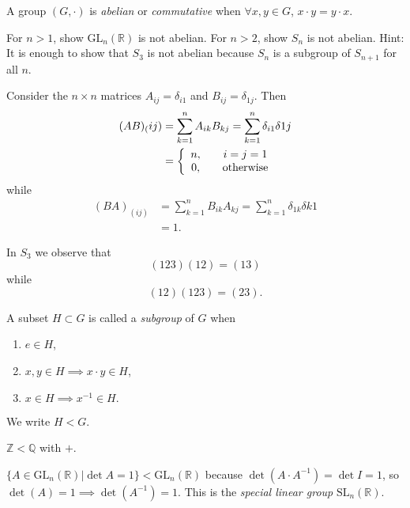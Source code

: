 \begin{defn}
  \label{def:abelian-group}
  A group $(G, \cdot)$ is \emph{abelian} or \emph{commutative} when
  $\forall x, y \in G$, $x \cdot y = y \cdot x$.
\end{defn}

\begin{Problem}
  For $n > 1$, show $\mathrm{GL}_n(\mathbb{R})$ is not abelian.
  For $n > 2$, show $S_n$ is not abelian.
  Hint: It is enough to show that $S_3$ is not abelian because
  $S_n$ is a subgroup of $S_{n+1}$ for all $n$.
\end{Problem}

\begin{Answer}
Consider the $n \times n$ matrices $A_{ij} = \delta_{i1}$ and
$B_{ij} = \delta_{1j}$. Then
\begin{align*}
(A B)_(ij)
&= \sum_{k=1}^n A_{ik} B_{kj} = \sum_{k=1}^n \delta_{i1}\delta{1j} \\
&= \left\{\begin{array}{c c}
     n, & \quad i = j = 1 \\
     0, & \quad \text{otherwise}
\end{array}\right.
\end{align*}
while
\begin{align*}
(B A)_(ij)
&= \sum_{k=1}^n B_{ik} A_{kj} = \sum_{k=1}^n \delta_{1k}\delta{k1} \\
&= 1.
\end{align*}

In $S_3$ we observe that
$$
(1 2 3) (1 2) = (1 3)
$$
while
$$
(1 2) (1 2 3) = (2 3).
$$
\end{Answer}

\begin{defn}[Subgroup]
  \label{def:subgroup}
  A subset $H \subset G$ is called a \emph{subgroup} of $G$ when
  \begin{enumerate}
    \item{$e \in H$,}
    \item{$x, y \in H \implies x \cdot y \in H$,}
    \item{$x \in H \implies x^{-1} \in H.$}
  \end{enumerate}
  We write $H < G$.
\end{defn}

\begin{xmpl}
  \item{$\mathbb{Z} < \mathbb{Q}$ with $+$.}
  \item{$\{A \in \mathrm{GL}_n(\mathbb{R}) | \det A = 1\} < \mathrm{GL}_n(\mathbb{R})$
        because $\det (A \cdot A^{-1}) = \det I = 1$,
        so $\det(A) = 1 \implies \det(A^{-1}) = 1$. This is the
        \emph{special linear group} $\mathrm{SL}_n(\mathbb{R})$.
       }
\end{xmpl}

